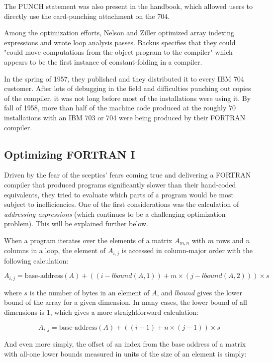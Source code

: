 The PUNCH statement was also present in the handbook, which allowed users to
directly use the card-punching attachment on the 704.

Among the optimization efforts, Nelson and Ziller optimized array indexing expressions and
wrote loop analysis passes.
Backus specifies that they could "could move computations from the object
program to the compiler" which appears to be the first instance of
\gls{constant-folding} in a compiler.

In the spring of 1957, they published 
and they distributed it to every IBM 704 customer.
After lots of debugging in the field and difficulties punching out copies
of the compiler, it was not long before most of the installations were using it.
By fall of 1958, more than half of the machine code produced at the roughly 70 installations
with an IBM 703 or 704 were being produced by their FORTRAN compiler.

\subsection{Optimizing FORTRAN I}

Driven by the fear of the sceptics' fears coming true and delivering a FORTRAN compiler
that produced programs significantly slower than their hand-coded equivalents,
they tried to evaluate which parts of a program would be most subject to inefficiencies.
One of the first considerations was the calculation of \textit{addressing expressions}
\cite{backus_heising_fortran_1964}
(which continues to be a challenging optimization problem).
This will be explained further below.

When a program iterates over the elements of a matrix $A_{m, n}$ with $m$ rows and $n$ columns in a loop,
the element of $A_{i, j}$ is accessed in column-major order with the following calculation:

\[
	A_{i, j} = \text{base-address}(A) + ((i - lbound(A, 1)) + m \times (j - lbound(A, 2))) \times s
\]

where $s$ is the number of bytes in an element of $A$, and $lbound$ gives the lower bound of the array
for a given dimension.
In many cases, the lower bound of all dimensions is $1$, which gives a more straightforward calculation:

\[
	A_{i, j} = \text{base-address}(A) + ((i - 1) + n \times (j - 1)) \times s
\]

And even more simply, the offset of an index from the base address of a matrix
with all-one lower bounds measured in units of the size of an element is simply:

